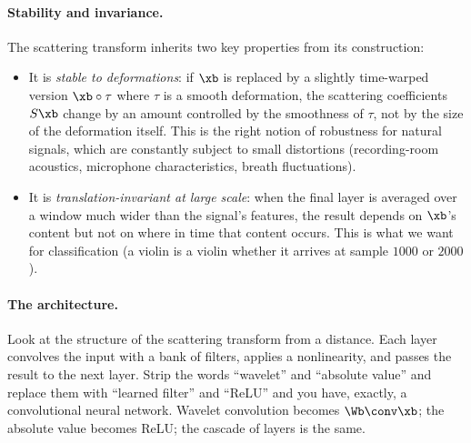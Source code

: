 \paragraph{Stability and invariance.}  The scattering transform inherits
two key properties from its construction:

\begin{itemize}
    \item It is \emph{stable to deformations}: if $\xb$ is replaced by
    a slightly time-warped version $\xb \circ \tau$ where $\tau$ is a
    smooth deformation, the scattering coefficients $S\xb$ change by an
    amount controlled by the smoothness of $\tau$, not by the size of
    the deformation itself.  This is the right notion of robustness for
    natural signals, which are constantly subject to small distortions
    (recording-room acoustics, microphone characteristics, breath
    fluctuations).

    \item It is \emph{translation-invariant at large scale}: when the
    final layer is averaged over a window much wider than the signal's
    features, the result depends on $\xb$'s content but not on where in
    time that content occurs.  This is what we want for classification
    (a violin is a violin whether it arrives at sample $1000$ or
    $2000$).
\end{itemize}


\paragraph{The architecture.}  Look at the structure of the scattering
transform from a distance.  Each layer convolves the input with a bank
of filters, applies a nonlinearity, and passes the result to the next
layer.  Strip the words ``wavelet'' and ``absolute value'' and replace
them with ``learned filter'' and ``ReLU'' and you have, exactly, a
convolutional neural network.  Wavelet convolution becomes
$\Wb \conv \xb$; the absolute value becomes ReLU; the cascade of
layers is the same.

